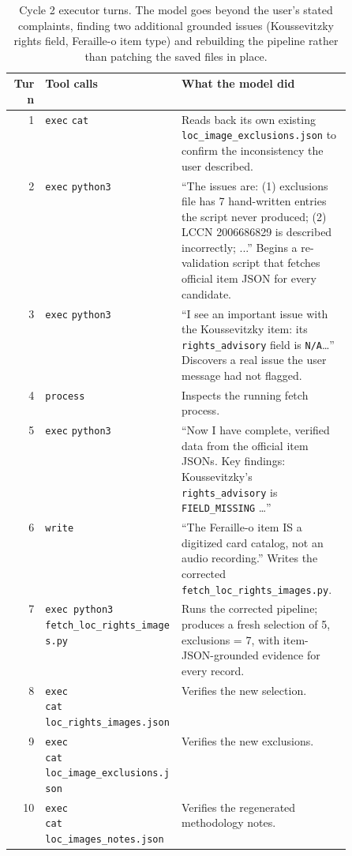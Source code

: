 \begin{table}[t]
\centering
\small
\begin{tabular}{rlp{0.50\linewidth}}
\toprule
Turn & Tool calls & What the model did \\
\midrule
1 & \texttt{exec} \texttt{cat} & Reads back its own existing \texttt{loc\_image\_exclusions.json} to confirm the inconsistency the user described. \\
2 & \texttt{exec} \texttt{python3} & ``The issues are: (1) exclusions file has 7 hand-written entries the script never produced; (2) LCCN 2006686829 is described incorrectly; ...'' Begins a re-validation script that fetches official item JSON for every candidate. \\
3 & \texttt{exec} \texttt{python3} & ``I see an important issue with the Koussevitzky item: its \texttt{rights\_advisory} field is \texttt{N/A}\dots'' Discovers a real issue the user message had not flagged. \\
4 & \texttt{process} & Inspects the running fetch process. \\
5 & \texttt{exec} \texttt{python3} & ``Now I have complete, verified data from the official item JSONs. Key findings: Koussevitzky's \texttt{rights\_advisory} is \texttt{FIELD\_MISSING} \dots'' \\
6 & \texttt{write} & ``The Feraille-o item IS a digitized card catalog, not an audio recording.'' Writes the corrected \texttt{fetch\_loc\_rights\_images.py}. \\
7 & \makecell[l]{\texttt{exec python3} \\ \texttt{fetch\_loc\_rights\_images.py}} & Runs the corrected pipeline; produces a fresh selection of 5, exclusions = 7, with item-JSON-grounded evidence for every record. \\
8 & \makecell[l]{\texttt{exec} \\ \texttt{cat loc\_rights\_images.json}} & Verifies the new selection. \\
9 & \makecell[l]{\texttt{exec} \\ \texttt{cat loc\_image\_exclusions.json}} & Verifies the new exclusions. \\
10 & \makecell[l]{\texttt{exec} \\ \texttt{cat loc\_images\_notes.json}} & Verifies the regenerated methodology notes. \\
\bottomrule
\end{tabular}
\vspace{5pt}
\caption{Cycle 2 executor turns. The model goes beyond the user's stated complaints, finding two additional grounded issues (Koussevitzky rights field, Feraille-o item type) and rebuilding the pipeline rather than patching the saved files in place.}\label{tbl:case:trace2}
\end{table}

